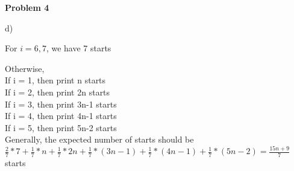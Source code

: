 \documentclass[12pt]{article}
\begin{document}
	
	\begin{center}
		{\Large\bf Problem 4}\\
		\vspace{3mm}
	\end{center}
	
	\def\question#1{\item[\bf #1.]}
	\def\part#1{\item[\bf #1)]}
	\newcommand{\pc}[1]{\mbox{\textbf{#1}}} %
	
	
	
	
	
	d)
	
	For $i=6,7$, we have 7 starts
	
	Otherwise,\\
	If i = 1, then print n starts\\
	If i = 2, then print 2n starts\\
	If i = 3, then print 3n-1 starts\\
	If i = 4, then print 4n-1 starts\\
	If i = 5, then print 5n-2 starts\\
	
	Generally, the expected number of starts should be $\frac{2}{7} * 7 + \frac{1}{7} * n + \frac{1}{7} * 2n + \frac{1}{7} * (3n-1) +\frac{1}{7} * (4n - 1) + \frac{1}{7} * (5n-2)= \frac{15n + 9}{7}$ starts
\end{document}
